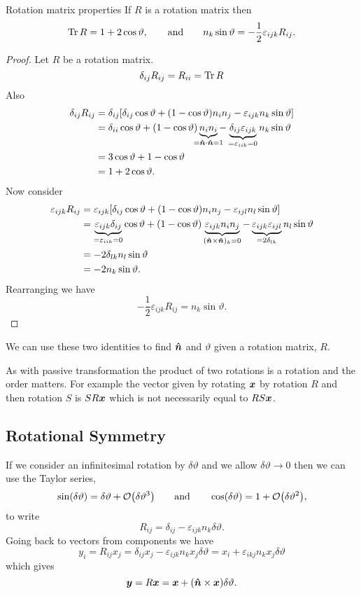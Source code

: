 \documentclass[a4paper]{article}
\begin{document}
    \begin{lemma}{Rotation matrix properties}{}
        If \(R\) is a rotation matrix then
        \[\Tr R = 1 + 2\cos\vartheta, \qquad\text{and}\qquad n_k\sin\vartheta = -\frac{1}{2}\varepsilon_{ijk}R_{ij}.\]
    \end{lemma}
    \begin{proof}
        Let \(R\) be a rotation matrix.
        \[\delta_{ij}R_{ij} = R_{ii} = \Tr R\]
        Also
        \begin{align*}
            \delta_{ij}R_{ij} &= \delta_{ij}[\delta_{ij} \cos\vartheta + (1 - \cos\vartheta)n_in_j - \varepsilon_{ijk}n_k\sin\vartheta]\\
            &= \delta_{ii}\cos\vartheta + (1 - \cos\vartheta)\underbrace{n_in_i}_{\mathclap{=\vh{n}\cdot\vh{n} = 1}} - \underbrace{\delta_{ij}\varepsilon_{ijk}}_{=\varepsilon_{iik} = 0}n_k\sin\vartheta\\
            &= 3\cos\vartheta + 1 - \cos\vartheta\\
            &= 1 + 2\cos\vartheta.
        \end{align*}
        Now consider
        \begin{align*}
            \varepsilon_{ijk}R_{ij} &= \varepsilon_{ijk}[\delta_{ij} \cos\vartheta + (1 - \cos\vartheta)n_in_j - \varepsilon_{ijl}n_l\sin\vartheta]\\
            &= \underbrace{\varepsilon_{ijk}\delta_{ij}}_{=\varepsilon_{iik} = 0}\cos\vartheta + (1 - \cos\vartheta)\underbrace{\varepsilon_{ijk}n_in_j}_{(\bm{\hat{n}}\times\bm{\hat{n}})_k = 0} - \underbrace{\varepsilon_{ijk}\varepsilon_{ijl}}_{=2\delta_{lk}} n_l\sin\vartheta\\
            &= -2\delta_{lk}n_l\sin\vartheta\\
            &= -2n_k\sin\vartheta.
        \end{align*}
        Rearranging we have
        \[-\frac{1}{2}\varepsilon_{ijk}R_{ij} = n_k\sin\vartheta.\]
    \end{proof}
    We can use these two identities to find \(\bm{\hat{n}}\) and \(\vartheta\) given a rotation matrix, \(R\).
    
    As with passive transformation the product of two rotations is a rotation and the order matters.
    For example the vector given by rotating \(\bm{x}\) by rotation \(R\) and then rotation \(S\) is \(SR\bm{x}\) which is not necessarily equal to \(RS\bm{x}\).
    
    \subsection{Rotational Symmetry}
    If we consider an infinitesimal rotation by \(\delta\vartheta\) and we allow \(\delta\vartheta \to 0\) then we can use the Taylor series,
    \[\sin(\delta\vartheta) = \delta\vartheta + \order{\delta\vartheta^3} \qquad\text{and}\qquad \cos(\delta\vartheta) = 1 + \order{\delta\vartheta^2},\]
    to write
    \[R_{ij} = \delta_{ij} - \varepsilon_{ijk}n_k\delta\vartheta.\]
    Going back to vectors from components we have
    \[y_i = R_{ij}x_j = \delta_{ij}x_j - \varepsilon_{ijk}n_kx_j\delta\vartheta = x_i + \varepsilon_{ikj}n_kx_j\delta\vartheta\]
    which gives
    \[\bm{y} = R\bm{x} = \bm{x} + (\bm{\hat{n}}\times\bm{x})\delta\vartheta.\]
    
\end{document}
